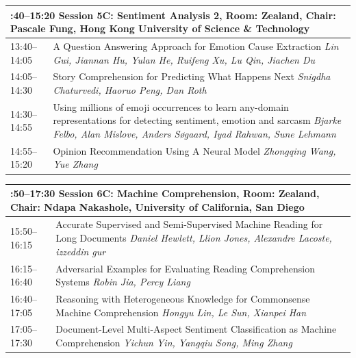 \documentclass{book}
\renewcommand{\large}{\fontsize{72}{80}\selectfont}
\renewcommand{\large}{\fontsize{82}{90}\selectfont}
\begin{document}
\begin{tabular}{p{20cm}p{70cm}}
  \multicolumn{2}{p{\textwidth}}{\bfseries\large 13:40--15:20 Session 5C: Sentiment Analysis 2, Room:  Zealand, Chair:  Pascale Fung, Hong Kong University of Science \& Technology} \\\hline

    
    13:40--14:05
    &	A Question Answering Approach for Emotion Cause Extraction \newline 
    {\itshape Lin Gui, Jiannan Hu, Yulan He, Ruifeng Xu, Lu Qin, Jiachen Du} \\
    
    14:05--14:30
    &	Story Comprehension for Predicting What Happens Next \newline 
    {\itshape Snigdha Chaturvedi, Haoruo Peng, Dan Roth} \\
    
    14:30--14:55
    &	Using millions of emoji occurrences to learn any-domain representations for detecting sentiment, emotion and sarcasm \newline 
    {\itshape Bjarke Felbo, Alan Mislove, Anders Søgaard, Iyad Rahwan, Sune Lehmann} \\
    
    14:55--15:20
    &	Opinion Recommendation Using A Neural Model \newline 
    {\itshape Zhongqing Wang, Yue Zhang} \\
    
\end{tabular}
\vspace*{\fill}

\begin{tabular}{p{20cm}p{70cm}}
  \multicolumn{2}{p{\textwidth}}{\bfseries\large 15:50--17:30 Session 6C: Machine Comprehension, Room:  Zealand, Chair:  Ndapa Nakashole, University of California, San Diego} \\\hline

    
    15:50--16:15
    &	Accurate Supervised and Semi-Supervised Machine Reading for Long Documents \newline 
    {\itshape Daniel Hewlett, Llion Jones, Alexandre Lacoste, izzeddin gur} \\
    
    16:15--16:40
    &	Adversarial Examples for Evaluating Reading Comprehension Systems \newline 
    {\itshape Robin Jia, Percy Liang} \\
    
    16:40--17:05
    &	Reasoning with Heterogeneous Knowledge for Commonsense Machine Comprehension \newline 
    {\itshape Hongyu Lin, Le Sun, Xianpei Han} \\
    
    17:05--17:30
    &	Document-Level Multi-Aspect Sentiment Classification as Machine Comprehension \newline 
    {\itshape Yichun Yin, Yangqiu Song, Ming Zhang} \\
    
\end{tabular}
\vspace*{\fill}
\end{document}
